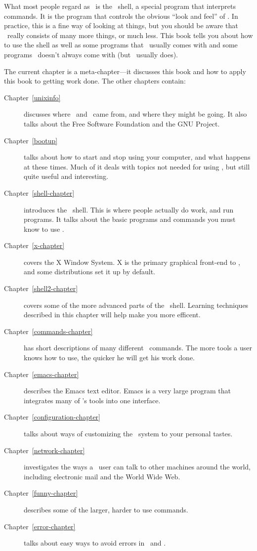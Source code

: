 What most people regard as \unix\ is the \unix\ shell, a special
program that interprets commands.  It is the program that controls the
obvious ``look and feel'' of \unix.  In practice, this is a fine way
of looking at things, but you should be aware that \unix\ really
consists of many more things, or much less.  This book tells you about
how to use the shell as well as some programs that \unix\ usually
comes with and some programs \unix\ doesn't always come with (but
\linux\ usually does).

The current chapter is a meta-chapter---it discusses this book and how
to apply this book to getting work done.  The other chapters contain:

\begin{description}
\item [Chapter~\ref{unixinfo}] discusses where \unix\ and \linux\ came
  from, and where they might be going.  It also talks about the Free
  Software Foundation and the GNU
  Project.
\item [Chapter~\ref{bootup}] talks about how to start and stop using
  your computer, and what happens at these times.  Much of it deals
  with topics not needed for using \linux, but still quite useful and
  interesting.
\item [Chapter~\ref{shell-chapter}] introduces the \unix\ shell.  This
  is where people actually do work, and run programs.  It talks about
  the basic programs and commands you must know to use \unix.
\item [Chapter~\ref{x-chapter}] covers the X Window System. X is the
  primary graphical front-end to \unix, and some distributions set it
  up by default.
\item [Chapter~\ref{shell2-chapter}] covers some of the more advanced
  parts of the \unix\ shell. Learning techniques described in this
  chapter will help make you more efficent.
\item [Chapter~\ref{commands-chapter}] has short descriptions of many
  different \unix\ commands. The more tools a user knows how to use,
  the quicker he will get his work done.
\item [Chapter~\ref{emacs-chapter}] describes the Emacs text
  editor. Emacs is a very large program that integrates many of
  \unix's tools into one interface.
\item [Chapter~\ref{configuration-chapter}] talks about ways of
  customizing the \unix\ system to your personal tastes.
\item [Chapter~\ref{network-chapter}] investigates the ways a \unix\
  user can talk to other machines around the world, including
  electronic mail and the World Wide Web.
\item [Chapter~\ref{funny-chapter}] describes some of the larger,
  harder to use commands.
\item [Chapter~\ref{error-chapter}] talks about easy ways to avoid
  errors in \unix\ and \linux.
\end{description}


